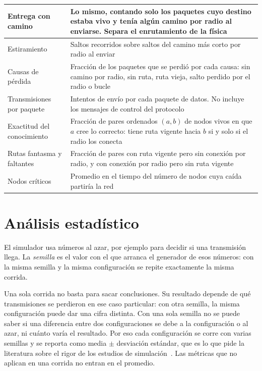 \begin{table}[htbp!]
\begin{tabular}{|p{3.5cm}|p{10.7cm}|}
        \hline
        Entrega con camino & Lo mismo, contando solo los paquetes cuyo destino estaba vivo y tenía algún camino por radio al enviarse. Separa el enrutamiento de la física \\
        \hline
        Estiramiento & Saltos recorridos sobre saltos del camino más corto por radio al enviar \\
        \hline
        Causas de pérdida & Fracción de los paquetes que se perdió por cada causa: sin camino por radio, sin ruta, ruta vieja, salto perdido por el radio o bucle \\
        \hline
        Transmisiones por paquete & Intentos de envío por cada paquete de datos. No incluye los mensajes de control del protocolo \\
        \hline
        Exactitud del conocimiento & Fracción de pares ordenados $(a,b)$ de nodos vivos en que $a$ cree lo correcto: tiene ruta vigente hacia $b$ si y solo si el radio los conecta \\
        \hline
        Rutas fantasma y faltantes & Fracción de pares con ruta vigente pero sin conexión por radio, y con conexión por radio pero sin ruta vigente \\
        \hline
        Nodos críticos & Promedio en el tiempo del número de nodos cuya caída partiría la red \\
        \hline
    \end{tabular}
\end{table}

\section{Análisis estadístico}
\label{sec:analisis-estadistico}

El simulador usa números al azar, por ejemplo para decidir si una transmisión
llega. La \textit{semilla} es el valor con el que arranca el generador de esos
números: con la misma semilla y la misma configuración se repite exactamente la
misma corrida.

Una sola corrida no basta para sacar conclusiones. Su resultado depende de qué
transmisiones se perdieron en ese caso particular: con otra semilla, la misma
configuración puede dar una cifra distinta. Con una sola semilla no se puede
saber si una diferencia entre dos configuraciones se debe a la configuración o
al azar, ni cuánto varía el resultado. Por eso cada configuración se corre con
varias semillas y se reporta como media $\pm$ desviación estándar, que es lo que
pide la literatura sobre el rigor de los estudios de
simulación~\cite{Pawlikowski2002Credibility,Kurkowski2005Incredibles}. Las
métricas que no aplican en una corrida no entran en el promedio.

